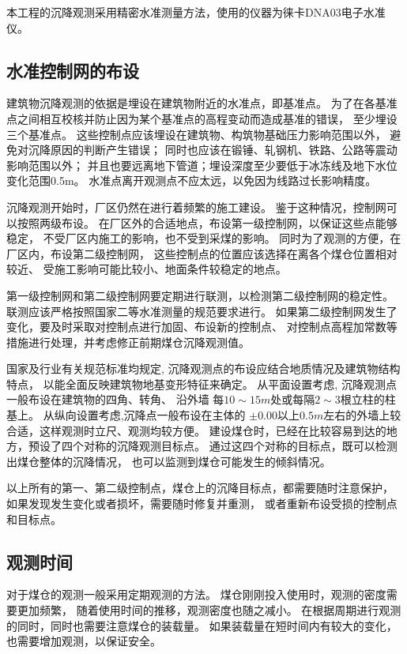 本工程的沉降观测采用精密水准测量方法，使用的仪器为徕卡DNA03电子水准仪。

\subsection{水准控制网的布设}
建筑物沉降观测的依据是埋设在建筑物附近的水准点，即基准点。
为了在各基准点之间相互校核并防止因为某个基准点的高程变动而造成基准的错误，
至少埋设三个基准点。
这些控制点应该埋设在建筑物、构筑物基础压力影响范围以外，
避免对沉降原因的判断产生错误；
同时也应该在锻锤、轧钢机、铁路、公路等震动影响范围以外；
并且也要远离地下管道；埋设深度至少要低于冰冻线及地下水位变化范围0.5m。
水准点离开观测点不应太远，以免因为线路过长影响精度。

沉降观测开始时，厂区仍然在进行着频繁的施工建设。
鉴于这种情况，控制网可以按照两级布设。
在厂区外的合适地点，布设第一级控制网，以保证这些点能够稳定，
不受厂区内施工的影响，也不受到采煤的影响。
同时为了观测的方便，在厂区内，布设第二级控制网，
这些控制点的位置应该选择在离各个煤仓位置相对较近、
受施工影响可能比较小、地面条件较稳定的地点。

第一级控制网和第二级控制网要定期进行联测，以检测第二级控制网的稳定性。
联测应该严格按照国家二等水准测量的规范要求进行。
如果第二级控制网发生了变化，要及时采取对控制点进行加固、布设新的控制点、
对控制点高程加常数等措施进行处理，并考虑修正前期煤仓沉降观测值。

国家及行业有关规范标准均规定,
沉降观测点的布设应结合地质情况及建筑物结构特点，
以能全面反映建筑物地基变形特征来确定。
从平面设置考虑, 沉降观测点一般布设在建筑物的四角、转角、
沿外墙 每$10\sim15m$处或每隔$2\sim3$根立柱的柱基上。
从纵向设置考虑,沉降点一般布设在主体的
$± 0.00$以上$0.5m$左右的外墙上较合适，这样观测时立尺、观测均较方便。
建设煤仓时，已经在比较容易到达的地方，预设了四个对称的沉降观测目标点。
通过这四个对称的目标点，既可以检测出煤仓整体的沉降情况，
也可以监测到煤仓可能发生的倾斜情况。

以上所有的第一、第二级控制点，煤仓上的沉降目标点，都需要随时注意保护，
如果发现发生变化或者损坏，需要随时修复并重测，
或者重新布设受损的控制点和目标点。

\subsection{观测时间}
对于煤仓的观测一般采用定期观测的方法。
煤仓刚刚投入使用时，观测的密度需要更加频繁，
随着使用时间的推移，观测密度也随之减小。
在根据周期进行观测的同时，同时也需要注意煤仓的装载量。
如果装载量在短时间内有较大的变化，也需要增加观测，以保证安全。

